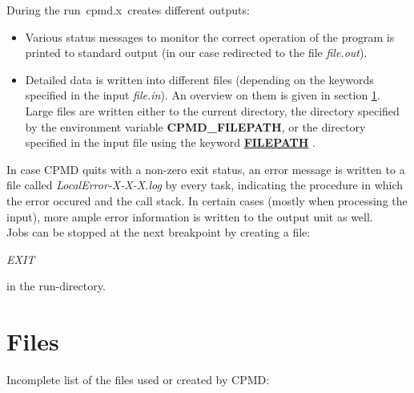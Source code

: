 \documentclass[twoside,10pt,titlepage,a4paper]{article}
\newcommand{\referto}[2]{\hyperlink{#1}{#2}}
\newcommand{\referto}[2]{\htmlref{#2}{#1}}
\newcommand{\refkeyword}[1]{%
\referto{#1}{\textbf{#1}}%
\index{#1}%
}%
\begin{document}
During the run\ cpmd.x\ creates different outputs:
\begin{itemize}
\item Various status messages to monitor the correct operation of the program is
  printed to standard output (in our case redirected to the file {\sl file.out}).

\item
  Detailed data is written into different files (depending on the keywords
  specified in the input {\sl file.in}). An overview on them is given in section
  \ref{FILES}. Large files are written either to the current directory, the directory
  specified by the environment variable {\bf CPMD\_FILEPATH}, or the directory
  specified in the input file using the keyword \refkeyword{FILEPATH}.
\end{itemize}

In case CPMD quits with a non-zero exit status, an error message is written to a file called
\emph{LocalError-X-X-X.log} by every task, indicating the procedure in which the error occured
and the call stack. In certain cases (mostly when processing the input), more ample error information
is written to the output unit as well.
\\

  Jobs can be stopped at the next breakpoint by creating a file:

\medskip

\begin{center}
{\em EXIT}
\end{center}
                
\noindent
in the run-directory.
%
%
%
\clearpage
\section{Files}\label{FILES}
%

Incomplete list of the files used or created by CPMD:\par
\end{document}
